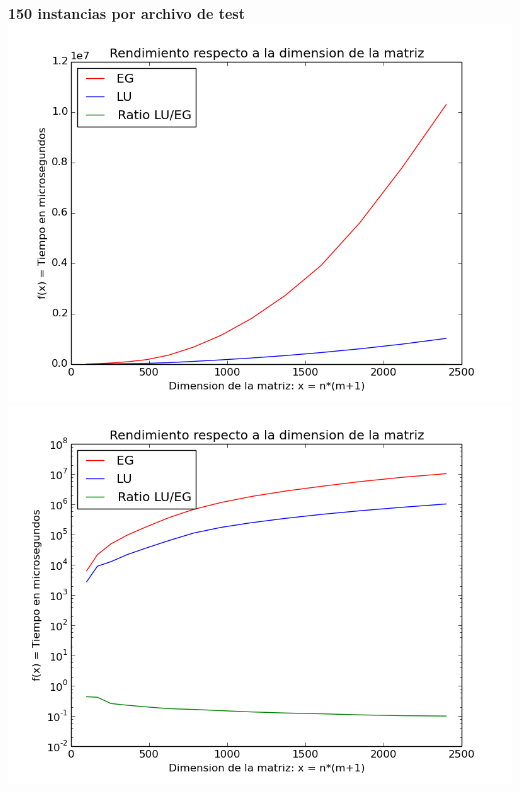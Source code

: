 \begin{center}
\textbf{150 instancias por archivo de test}\\
\includegraphics[scale=0.35]{experimentos2a_2b/gauss_vs_lu_150_inst/gauss_vs_lu_time_consumed_abs.png}
\includegraphics[scale=0.35]{experimentos2a_2b/gauss_vs_lu_150_inst/gauss_vs_lu_time_consumed_log.png}
\end{center}

